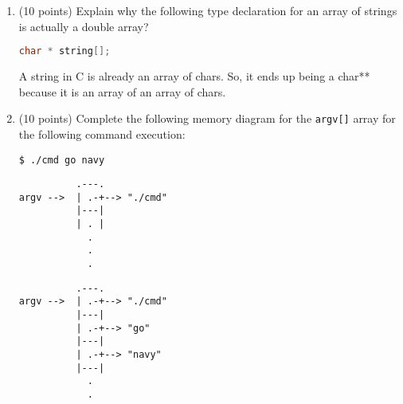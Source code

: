 \documentclass{article}[9pt]
\newenvironment{answerfont}{\fontfamily{qhv}\selectfont}{\par}
\newenvironment{myanswer}{\begin{mdframed}\begin{answerfont}}{\end{answerfont}\end{mdframed}}
\begin{document}
\begin{enumerate}
\begin{lstlisting}[language=c]
int main(){
  int darray[][4] = {{1, 9, 8, 4},
                     {1, 8, 9, 4},
                     {2, 0, 1, 7},
                     {3, 4, 5, 8}};

  int * p = &(darray[1]);

  printf("%d\n", p[2]);
}
\end{lstlisting}

\begin{myanswer}
Output: 9
\begin{verbatim}
{   { 1, 9, 8, 4 },   { 1, 8, 9, 4 },   { 2, 0, 1, 7 },   { 3, 4, 5, 8 }   }
    ^                 ^       ^
    |                 |       |
    .---.             |       |
        |             |       |
darray--.             |       |
                      |       |
p == &(darray[1])-----.       |
                              |
p[2] == &(darray[1]) + 2------.

\end{verbatim}
\end{myanswer}


\item (10 points) Explain why the following type declaration for an array of strings is actually a double array? 

\begin{lstlisting}[language=c]
char * string[];
\end{lstlisting}

\begin{myanswer}
A string in C is already an array of chars.  So, it ends up being a
char** because it is an array of an array of chars.
\end{myanswer}

\item (10 points) Complete the following memory diagram for the \texttt{argv[]} array for
the following command execution:

\begin{verbatim}
$ ./cmd go navy
\end{verbatim}

\begin{verbatim}
          .---.
argv -->  | .-+--> "./cmd"
          |---|
          | . |
            .
            .
            .
\end{verbatim}

\begin{myanswer}
\begin{verbatim}
          .---.
argv -->  | .-+--> "./cmd"
          |---|
          | .-+--> "go"
          |---|
          | .-+--> "navy"
          |---|
            . 
            . 
\end{verbatim}
\end{myanswer}



\end{enumerate}
\end{document}
